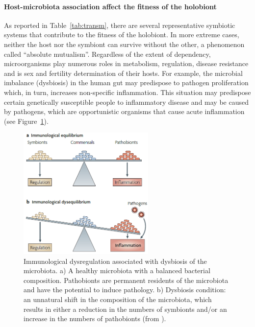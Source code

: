 \paragraph{Host-microbiota association affect the fitness of the holobiont}
As reported in Table~\ref{tab:transm}, there are several representative symbiotic systems that contribute to the fitness of the holobiont. In more extreme cases, neither the host nor the symbiont can survive without the other, a phenomenon called ``absolute mutualism''. Regardless of the extent of dependency, microorganisms play numerous roles in metabolism, regulation, disease resistance and is sex and fertility determination of their hosts. For example, the microbial imbalance (dysbiosis) in the human gut may predispose to pathogen proliferation which, in turn, increases non-specific inflammation. This situation may predispose certain genetically susceptible people to inflammatory disease and may be caused by pathogens, which are opportunistic organisms that cause acute inflammation \cite{round2009gut} (see Figure~\ref{fig:dysb}).\\%
\begin{figure}[!tb]
	\centering
	\includegraphics[width=0.6\textwidth]{./figures/Introduction/gut_dysbiosis}
  	\caption{Immunological dysregulation associated with dysbiosis of the microbiota. a) A healthy microbiota with a balanced bacterial composition. Pathobionts are permanent residents of the microbiota and have the potential to induce pathology. b) Dysbiosis condition: an unnatural shift in the composition of the microbiota, which results in either a reduction in the numbers of symbionts and/or an increase in the numbers of pathobionts (from \cite{round2009gut}). \label{fig:dysb}}
\end{figure}%
